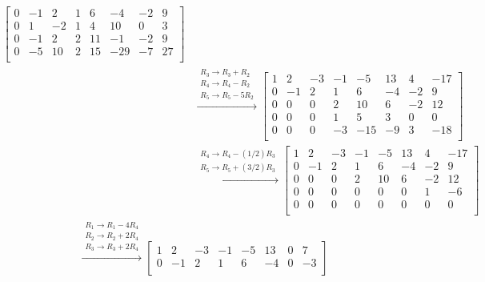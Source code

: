 \documentclass{article}
\begin{document}
\begin{itemize}
\begin{align*}
\begin{bmatrix}
0 & -1 &   2 &  1 &   6 &   -4 & -2 &    9 \\
0 &  1 &  -2 &  1 &   4 &  10 &   0 &    3 \\
0 & -1 &   2 &  2 & 11 &   -1 & -2 &    9 \\ 
0 & -5 & 10 &  2 & 15 & -29 & -7 &  27 \\
\end{bmatrix} \\ 
& \xrightarrow{\begin{array}{c} R_3 \rightarrow R_3 + R_2 \\ R_4 \rightarrow R_4 - R_2 \\ R_5 \rightarrow R_5 - 5R_2 \end{array}} \begin{bmatrix}
1 &  2 & -3 & -1 &   -5 &  13 &  4 & -17 \\
0 & -1 &  2 &  1 &     6 &  -4 & -2 &    9 \\
0 &  0 &  0 &  2 &   10 &    6 & -2 &  12 \\
0 &  0 &  0 &  1 &     5 &    3 &  0 &    0 \\ 
0 &  0 &  0 & -3 & -15 &   -9 &  3 & -18 \\
\end{bmatrix} \\ 
& \xrightarrow{\begin{array}{c} R_4 \rightarrow R_4 - (1/2)R_3 \\ R_5 \rightarrow R_5 + (3/2)R_3 \end{array}} \begin{bmatrix}
1 &  2 & -3 & -1 & -5 & 13 &  4 & -17 \\
0 & -1 &  2 &  1 &   6 & -4 & -2 &    9 \\
0 &  0 &  0 &  2 & 10 &   6 & -2 & 12 \\
0 &  0 &  0 &  0 &   0 &   0 &  1 &  -6 \\ 
0 &  0 &  0 &  0 &   0 &   0 &  0 &   0 \\
\end{bmatrix} 
\end{align*}
\begin{align*}
& \xrightarrow{\begin{array}{c} R_1 \rightarrow R_1 - 4R_4 \\ R_2 \rightarrow R_2 + 2R_4 \\ R_3 \rightarrow R_3 + 2R_4 \end{array}} \begin{bmatrix}
1 &  2 & -3 & -1 & -5 & 13 & 0 &  7 \\
0 & -1 &  2 &  1 &   6 & -4 & 0 & -3 \\

\end{bmatrix}
\end{align*}
\end{itemize}
\end{document}
